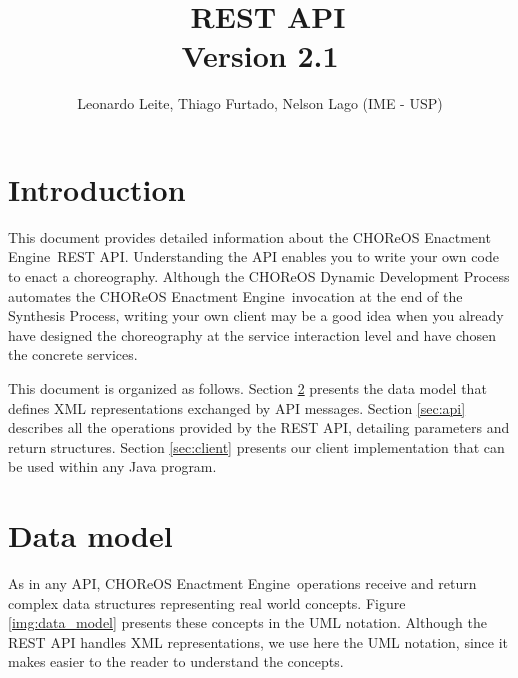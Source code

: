\documentclass[a4paper, 10pt]{article}
\title{\ee\ REST API \\ {\normalsize Version 2.1}}
\author{Leonardo Leite, Thiago Furtado, Nelson Lago (IME - USP)}
\newcommand{\ee}{CHOReOS Enactment Engine}
\begin{document}
\maketitle

\section{Introduction}

This document provides detailed information about the \ee\ REST API. 
Understanding the API enables you to write your own code to enact a choreography.
Although the CHOReOS Dynamic Development Process automates the \ee\ invocation at the end of the Synthesis Process, writing your own client may be a good idea when you already have designed the choreography at the service interaction level and have chosen the concrete services. 

This document is organized as follows. Section \ref{sec:model} presents the data model that defines XML representations exchanged by API messages. Section \ref{sec:api} describes all the operations provided by the REST API, detailing parameters and return structures. Section \ref{sec:client} presents our client implementation that can be used within any Java program.

\section{Data model}
\label{sec:model}

As in any API, \ee\ operations receive and return complex data structures representing real world concepts. 
Figure \ref{img:data_model} presents these concepts in the UML notation.
Although the REST API handles XML representations, we use here the UML notation, since it makes easier to the reader to understand the concepts.
\end{document}
